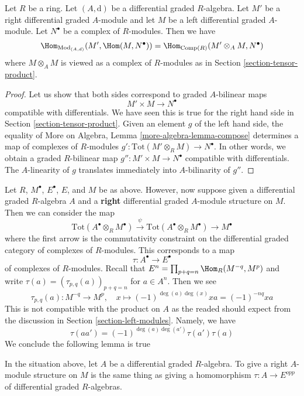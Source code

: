 \begin{lemma}
\label{lemma-characterize-hom}
Let $R$ be a ring. Let $(A, \text{d})$ be a differential graded $R$-algebra.
Let $M'$ be a right differential graded $A$-module and let
$M$ be a left differential graded $A$-module.
Let $N^\bullet$ be a complex of $R$-modules. Then we have
$$
\Hom_{\text{Mod}_{(A, d)}}(M', \Hom(M, N^\bullet)) =
\Hom_{\text{Comp}(R)}(M' \otimes_A M, N^\bullet)
$$
where $M \otimes_A M$ is viewed as a complex of $R$-modules
as in Section \ref{section-tensor-product}.
\end{lemma}

\begin{proof}
Let us show that both sides correspond to graded $A$-bilinear maps
$$
M' \times M \longrightarrow N^\bullet
$$
compatible with differentials. We have seen this is true for the right
hand side in Section \ref{section-tensor-product}. Given an element
$g$ of the left hand side, the equality of
More on Algebra, Lemma \ref{more-algebra-lemma-compose}
determines a map of complexes of $R$-modules
$g' : \text{Tot}(M' \otimes_R M) \to N^\bullet$.
In other words, we obtain a graded $R$-bilinear
map $g'' : M' \times M \to N^\bullet$ compatible with differentials.
The $A$-linearity of $g$ translates immediately
into $A$-bilinarity of $g''$.
\end{proof}

\noindent
Let $R$, $M^\bullet$, $E^\bullet$, $E$, and $M$ be as above.
However, now suppose given a differential graded $R$-algebra $A$
and a {\bf right} differential graded $A$-module structure on $M$.
Then we can consider the map
$$
\text{Tot}(A^\bullet \otimes_R M^\bullet)
\xrightarrow{\psi}
\text{Tot}(A^\bullet \otimes_R M^\bullet)
\to
M^\bullet
$$
where the first arrow is the commutativity constraint on the
differential graded category of complexes of $R$-modules.
This corresponds to a map
$$
\tau : A^\bullet \longrightarrow E^\bullet
$$
of complexes of $R$-modules. Recall that
$E^n = \prod_{p + q = n} \Hom_R(M^{-q}, M^p)$
and write $\tau(a) = (\tau_{p, q}(a))_{p + q = n}$ for $a \in A^n$.
Then we see
$$
\tau_{p, q}(a) : M^{-q} \longrightarrow M^p,\quad
x \longmapsto (-1)^{\deg(a)\deg(x)}x a = (-1)^{-nq}xa
$$
This is not compatible with the product on $A$ as the readed should
expect from the discussion in Section \ref{section-left-modules}.
Namely, we have
$$
\tau(a a') = (-1)^{\deg(a)\deg(a')}\tau(a') \tau(a)
$$
We conclude the following lemma is true

\begin{lemma}
\label{lemma-right-module-structure}
In the situation above, let $A$ be a differential graded $R$-algebra.
To give a right $A$-module structure on $M$ is the same thing as
giving a homomorphism $\tau : A \to E^{opp}$
of differential graded $R$-algebras.
\end{lemma}

